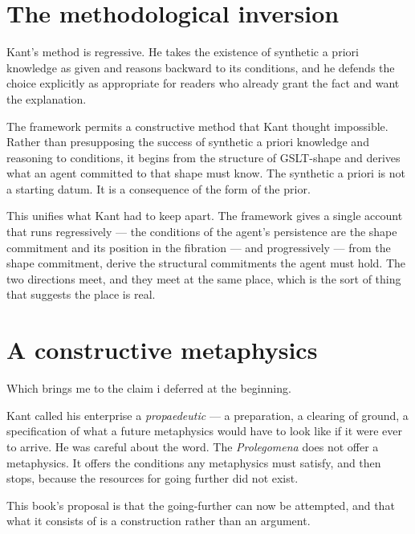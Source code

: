 \section{The methodological inversion}
\label{sec:kant-method}

Kant's method is regressive.
He takes the existence of synthetic a priori knowledge as given and
reasons backward to its conditions, and he defends the choice
explicitly as appropriate for readers who already grant the fact
and want the explanation.

The framework permits a constructive method that Kant thought
impossible.
Rather than presupposing the success of synthetic a priori
knowledge and reasoning to conditions, it begins from the structure
of GSLT-shape and derives what an agent committed to that shape
must know.
The synthetic a priori is not a starting datum.
It is a consequence of the form of the prior.

This unifies what Kant had to keep apart.
The framework gives a single account that runs regressively --- the
conditions of the agent's persistence are the shape commitment and
its position in the fibration --- and progressively --- from the
shape commitment, derive the structural commitments the agent must
hold.
The two directions meet, and they meet at the same place, which is
the sort of thing that suggests the place is real.

\section{A constructive metaphysics}
\label{sec:constructive-metaphysics}

Which brings me to the claim i deferred at the beginning.

Kant called his enterprise a \emph{propaedeutic} --- a
preparation, a clearing of ground, a specification of what a future
metaphysics would have to look like if it were ever to arrive.
He was careful about the word.
The \emph{Prolegomena} does not offer a metaphysics.
It offers the conditions any metaphysics must satisfy, and then
stops, because the resources for going further did not exist.

This book's proposal is that the going-further can now be
attempted, and that what it consists of is a construction rather
than an argument.

